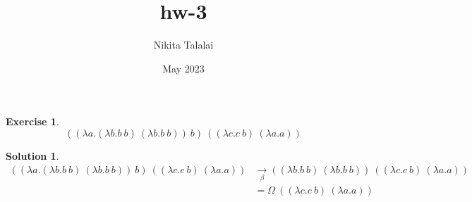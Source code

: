 \documentclass[a4paper, 12pt]{article}
\title{hw-3}
\author{Nikita Talalai}
\date{May 2023}
\newtheorem*{ex}{Exercise}
\newtheorem*{sol}{Solution}
\begin{document}
    \maketitle

    \begin{ex}
        \begin{equation}\label{1}
            ((\lambda a.(\lambda b.b\ b)\ (\lambda b.b\ b))\ b)\  ((\lambda c.c\ b)\ (\lambda a.a))
        \end{equation}
    \end{ex}

    \begin{sol}
        \begin{equation*}
            \begin{split}
                ((\lambda a.(\lambda b.b\ b)\ (\lambda b.b\ b))\ b)\  ((\lambda c.c\ b)\ (\lambda a.a)) 
                & \xrightarrow[\beta]{} ((\lambda b.b\ b)\ (\lambda b.b\ b))\  ((\lambda c.c\ b)\ (\lambda a.a))\\
                & = \Omega\ ((\lambda c.c\ b)\ (\lambda a.a))
            \end{split}
        \end{equation*}
    \end{sol}
    
\end{document}
